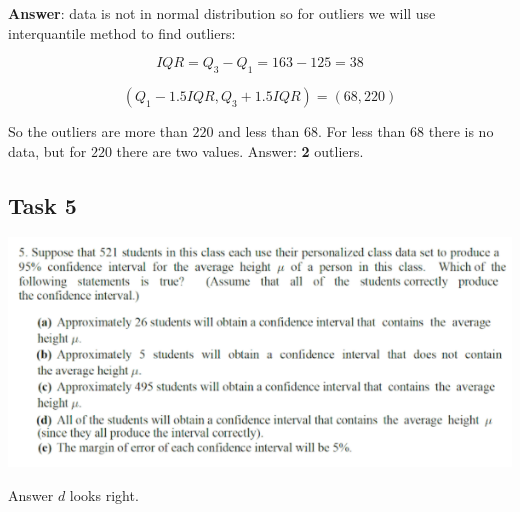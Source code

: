 \documentclass[%
12pt, %
final, %
oneside, %
onecolumn, %
centertags]{article} %
\theoremstyle{plain}
\theoremstyle{definition}
\theoremstyle{remark}
\begin{document}
\textbf{Answer}: data is not in normal distribution so for outliers we will use interquantile method to find outliers:

$$IQR = Q_3 - Q_1 = 163 - 125 = 38$$

$$(Q_1 - 1.5IQR, Q_3 + 1.5IQR) = (68, 220)$$

So the outliers are more than $220$ and less than $68$. For less than $68$ there is no data, but for $220$ there are two values. Answer: \textbf{2} outliers.




\subsection{Task 5}

\begin{center}
\includegraphics[scale=0.9]{5.png}
\end{center}

Answer $d$ looks right.
\end{document}
